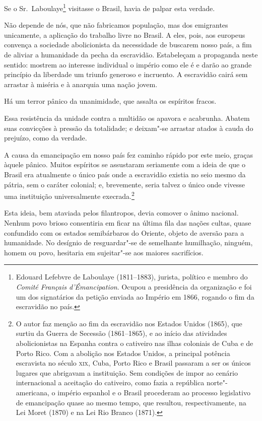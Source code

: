  Se o Sr.~Laboulaye\footnote{ Edouard Lefebvre de Laboulaye (1811--1883), 
jurista, político e membro do \textit{Comité Français d'Émancipation}. Ocupou a
presidência da organização e foi um dos signatários da petição enviada ao Império 
em 1866, rogando o fim da escravidão no país.} visitasse o Brasil, havia de palpar esta verdade. 

 Não depende de nós, que não fabricamos população, mas dos emigrantes
unicamente, a aplicação do trabalho livre no Brasil. A eles, pois, aos
europeus convença a sociedade abolicionista da necessidade de buscarem
nosso país, a fim de aliviar a humanidade da pecha da escravidão.
Estabeleçam a propaganda neste sentido: mostrem ao interesse individual
o império como ele é e darão ao grande princípio da liberdade um
triunfo generoso e incruento. A escravidão cairá sem arrastar à miséria
e à anarquia uma nação jovem.

\sectionitem

 Há um terror pânico da unanimidade, que assalta os espíritos fracos.

 Essa resistência da unidade contra a multidão os apavora e acabrunha.
Abatem suas convicções à pressão da totalidade; e deixam"-se arrastar
atados à cauda do prejuízo, como da verdade. 

 A causa da emancipação em nosso país fez caminho rápido por este meio,
graças àquele pânico. Muitos espíritos se assustaram seriamente com a
ideia de que o Brasil era atualmente o único país onde a escravidão
existia no seio mesmo da pátria, sem o caráter colonial; e, brevemente,
seria talvez o único onde vivesse uma instituição universalmente
execrada.\footnote{ O autor faz menção ao fim da escravidão nos Estados Unidos (1865), que surtiu
da Guerra de Secessão (1861--1865), e ao início das atividades
abolicionistas na Espanha contra o cativeiro nas ilhas coloniais de
Cuba e de Porto Rico. Com a abolição nos Estados Unidos, a principal
potência escravista no século \textsc{xix}, Cuba, Porto Rico e Brasil passaram a
ser os únicos lugares que abrigavam a instituição. Sem condições de
impor ao cenário internacional a aceitação do cativeiro, como fazia a
república norte"-americana, o império espanhol e o Brasil procederam
ao processo legislativo de emancipação quase ao mesmo tempo, que
resultou, respectivamente, na Lei Moret (1870) e na Lei Rio Branco (1871).}

 Esta ideia, bem ataviada pelos filantropos, devia comover o ânimo
nacional. Nenhum povo brioso consentiria em ficar na última fila das
nações cultas, quase confundido com os estados semibárbaros do Oriente,
objeto de aversão para a humanidade. No desígnio de resguardar"-se de
semelhante humilhação, ninguém, homem ou povo, hesitaria em
sujeitar"-se aos maiores sacrifícios.

